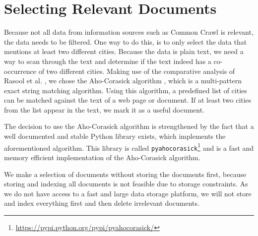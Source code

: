 \section{Selecting Relevant Documents}
Because not all data from information sources such as Common Crawl is relevant, the data needs to be filtered. One way to do this, is to only select the data that mentions at least two different cities. Because the data is plain text, we need a way to scan through the text and determine if the text indeed has a co-occurrence of two different cities.
Making use of the comparative analysis of Rasool et al. \cite{rasool2012string}, we chose the Aho-Corasick algorithm \cite{Aho-Corasick}, which is a multi-pattern exact string matching algorithm. Using this algorithm, a predefined list of cities can be matched against the text of a web page or document. If at least two cities from the list appear in the text, we mark it as a useful document.

The decision to use the Aho-Corasick algorithm is strengthened by the fact that a well documented and stable Python library exists, which implements the aforementioned algorithm. This library is called \texttt{pyahocorasick}\footnote{\url{https://pypi.python.org/pypi/pyahocorasick/}} and is a fast and memory efficient implementation of the Aho-Corasick algorithm.

We make a selection of documents without storing the documents first, because storing and indexing all documents is not feasible due to storage constraints. As we do not have access to a fast and large data storage platform, we will not store and index everything first and then delete irrelevant documents.
